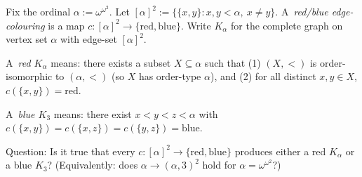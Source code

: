 Fix the ordinal $\alpha := \omega^{\omega^2}$.
Let $[\alpha]^2 := \{\{x,y\}: x,y<\alpha,\ x\neq y\}$.
A \,\emph{red/blue edge-colouring} is a map $c:[\alpha]^2\to\{\text{red},\text{blue}\}$.
Write $K_\alpha$ for the complete graph on vertex set $\alpha$ with edge-set $[\alpha]^2$.

A \,\emph{red $K_\alpha$} means: there exists a subset $X\subseteq \alpha$ such that
(1) $(X,<)$ is order-isomorphic to $(\alpha,<)$ (so $X$ has order-type $\alpha$), and
(2) for all distinct $x,y\in X$, $c(\{x,y\})=\text{red}$.

A \,\emph{blue $K_3$} means: there exist $x<y<z<\alpha$ with
$c(\{x,y\})=c(\{x,z\})=c(\{y,z\})=\text{blue}$.

Question: Is it true that every $c:[\alpha]^2\to\{\text{red},\text{blue}\}$ produces either a red $K_\alpha$ or a blue $K_3$?
(Equivalently: does $\alpha\to(\alpha,3)^2$ hold for $\alpha=\omega^{\omega^2}$?)
